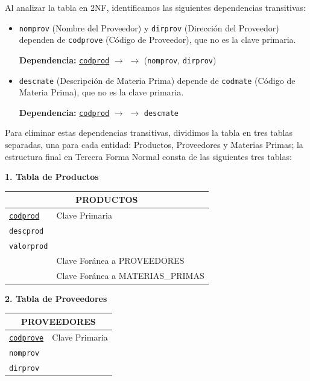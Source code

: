 \documentclass[12pt, a4paper]{article}
\newcommand{\pk}[1]{\underline{\texttt{#1}}}      %
\newcommand{\fk}[1]{\uuline{\texttt{#1}}}      %
\begin{document}
Al analizar la tabla en 2NF, identificamos las siguientes dependencias transitivas:

\begin{itemize}
    \item \texttt{nomprov} (Nombre del Proveedor) y \texttt{dirprov} (Dirección del Proveedor) dependen de \texttt{codprove} (Código de Proveedor), que no es la clave primaria.
    
    \textbf{Dependencia:} \pk{codprod} $\rightarrow$ \fk{codprove} $\rightarrow$ (\texttt{nomprov}, \texttt{dirprov})

    \item \texttt{descmate} (Descripción de Materia Prima) depende de \texttt{codmate} (Código de Materia Prima), que no es la clave primaria.
    
    \textbf{Dependencia:} \pk{codprod} $\rightarrow$ \fk{codmate} $\rightarrow$ \texttt{descmate}
\end{itemize}

Para eliminar estas dependencias transitivas, dividimos la tabla en tres tablas separadas, una para cada entidad: Productos, Proveedores y Materias Primas; la estructura final en Tercera Forma Normal consta de las siguientes tres tablas:

\vspace{0.5cm}
\begin{center}
    \textbf{1. Tabla de Productos}
    
    \vspace{0.2cm}
    \begin{tabular}{|l|l|}
    \hline
    \multicolumn{2}{|c|}{\textbf{PRODUCTOS}} \\
    \hline
    \pk{codprod} & Clave Primaria \\
    \texttt{descprod} & \\
    \texttt{valorprod} & \\
    \fk{codprove} & Clave Foránea a PROVEEDORES \\
    \fk{codmate} & Clave Foránea a MATERIAS\_PRIMAS \\
    \hline
    \end{tabular}
\end{center}

\vspace{0.5cm}
\begin{center}
    \textbf{2. Tabla de Proveedores}

    \vspace{0.2cm}
    \begin{tabular}{|l|l|}
    \hline
    \multicolumn{2}{|c|}{\textbf{PROVEEDORES}} \\
    \hline
    \pk{codprove} & Clave Primaria \\
    \texttt{nomprov} & \\
    \texttt{dirprov} & \\
    \hline
    \end{tabular}
\end{center}
\end{document}
